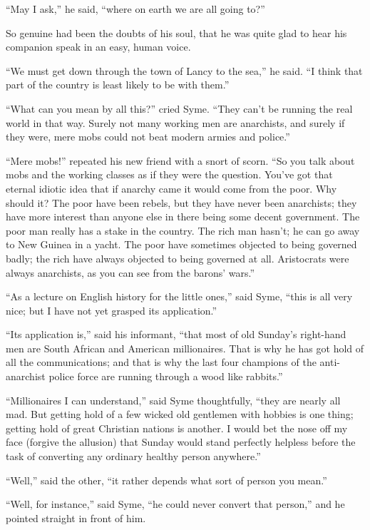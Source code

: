“May I ask,” he said, “where on earth we are all going to?”

So genuine had been the doubts of his soul, that he was quite glad to hear his companion speak in an easy, human voice.

“We must get down through the town of Lancy to the sea,” he said. “I think that part of the country is least likely to be with them.”

“What can you mean by all this?” cried Syme. “They can’t be running the real world in that way. Surely not many working men are anarchists, and surely if they were, mere mobs could not beat modern armies and police.”

“Mere mobs!” repeated his new friend with a snort of scorn. “So you talk about mobs and the working classes as if they were the question. You’ve got that eternal idiotic idea that if anarchy came it would come from the poor. Why should it? The poor have been rebels, but they have never been anarchists; they have more interest than anyone else in there being some decent government. The poor man really has a stake in the country. The rich man hasn’t; he can go away to New Guinea in a yacht. The poor have sometimes objected to being governed badly; the rich have always objected to being governed at all. Aristocrats were always anarchists, as you can see from the barons’ wars.”

“As a lecture on English history for the little ones,” said Syme, “this is all very nice; but I have not yet grasped its application.”

“Its application is,” said his informant, “that most of old Sunday’s right-hand men are South African and American millionaires. That is why he has got hold of all the communications; and that is why the last four champions of the anti-anarchist police force are running through a wood like rabbits.”

“Millionaires I can understand,” said Syme thoughtfully, “they are nearly all mad. But getting hold of a few wicked old gentlemen with hobbies is one thing; getting hold of great Christian nations is another. I would bet the nose off my face (forgive the allusion) that Sunday would stand perfectly helpless before the task of converting any ordinary healthy person anywhere.”

“Well,” said the other, “it rather depends what sort of person you mean.”

“Well, for instance,” said Syme, “he could never convert that person,” and he pointed straight in front of him.

